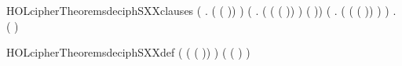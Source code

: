 \newcommand{\HOLcipherTheoremsdeciphPXXoneXXone}{\UseVerbatim{HOLcipherTheoremsdeciphPXXoneXXone}}
\begin{SaveVerbatim}{HOLcipherTheoremsdeciphSXXclauses}
\HOLTokenTurnstile{} (\HOLSymConst{\HOLTokenForall{}} .   (  ( )) \HOLSymConst{=}  ) \HOLSymConst{\HOLTokenConj{}}
   (\HOLSymConst{\HOLTokenForall{}}  .
      (  (  ( )) \HOLSymConst{=}  ) \HOLSymConst{\HOLTokenEquiv{}}
      ( \HOLSymConst{=} )) \HOLSymConst{\HOLTokenConj{}}
   (\HOLSymConst{\HOLTokenForall{}}  .
      (  (  ( )) \HOLSymConst{=} ) \HOLSymConst{\HOLTokenEquiv{}}  \HOLSymConst{\HOLTokenNotEqual{}} ) \HOLSymConst{\HOLTokenConj{}}
   \HOLSymConst{\HOLTokenForall{}} .   (  ) \HOLSymConst{=} 
\end{SaveVerbatim}
\newcommand{\HOLcipherTheoremsdeciphSXXclauses}{\UseVerbatim{HOLcipherTheoremsdeciphSXXclauses}}
\begin{SaveVerbatim}{HOLcipherTheoremsdeciphSXXdef}
\HOLTokenTurnstile{} (  (  ( )) \HOLSymConst{=}
      \HOLSymConst{=}      ) \HOLSymConst{\HOLTokenConj{}}
   (  (  ) \HOLSymConst{=} )
\end{SaveVerbatim}
\newcommand{\HOLcipherTheoremsdeciphSXXdef}{\UseVerbatim{HOLcipherTheoremsdeciphSXXdef}}
